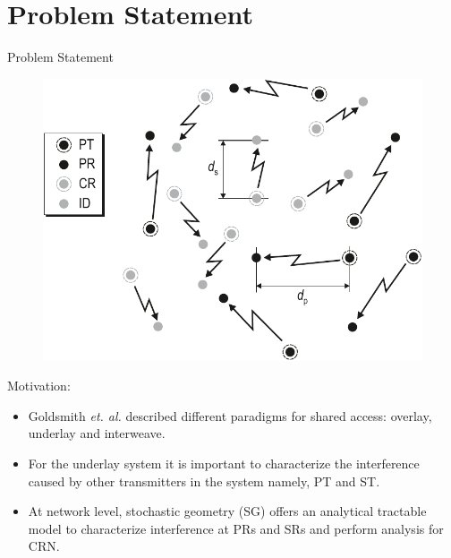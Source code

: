 \documentclass[12pt]{beamer}
\newcommand{\fs}[1]{\fontsize{ #1 pt}{8.2}\selectfont}
\begin{document}
\section{Problem Statement}
\begin{frame}{Problem Statement}
		\begin{overlayarea}{\textwidth}{4.4cm}
       	  	       	\begin{figure}
			\centering
        	        	\includegraphics[trim=0.0cm 0.0cm 0.0cm 0.0cm,clip=true,width=0.4 \paperwidth]{../figures/SGeometry}
			\end{figure}
		\end{overlayarea} 
		\begin{overlayarea}{\textwidth}{2.8cm}
		\only<1>
		{
			Motivation:
			\fs{8}
			\begin{itemize}
				\item Goldsmith \textit{et. al.} described different paradigms for shared access: overlay, underlay and interweave.
				\item For the underlay system it is important to characterize the interference caused by other transmitters in the system namely, PT and ST.
				\item At network level, stochastic geometry (SG) offers an analytical tractable model to characterize interference at PRs and SRs and perform analysis for CRN.

\end{itemize}}
\end{overlayarea}
\end{frame}
\end{document}
